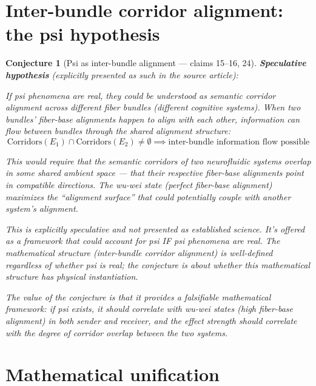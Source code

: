 \documentclass[11pt,a4paper]{article}
\newtheorem{conjecture}[definition]{Conjecture}
\begin{document}
\section{Inter-bundle corridor alignment: the psi hypothesis}
\label{sec:psi}

\begin{conjecture}[Psi as inter-bundle alignment --- claims 15--16, 24]
\label{conj:psi}
\textbf{Speculative hypothesis} (explicitly presented as such in the
source article):

If psi phenomena are real, they could be understood as semantic corridor
alignment across different fiber bundles (different cognitive systems).
When two bundles' fiber-base alignments happen to align with each other,
information can flow between bundles through the shared alignment
structure:
\[
  \text{Corridors}(E_1) \cap \text{Corridors}(E_2) \neq \emptyset
  \implies \text{inter-bundle information flow possible}
\]

This would require that the semantic corridors of two neurofluidic
systems overlap in some shared ambient space --- that their respective
fiber-base alignments point in compatible directions. The wu-wei state
(perfect fiber-base alignment) maximizes the ``alignment surface'' that
could potentially couple with another system's alignment.

This is explicitly speculative and not presented as established science.
It's offered as a framework that \emph{could} account for psi IF psi
phenomena are real. The mathematical structure (inter-bundle corridor
alignment) is well-defined regardless of whether psi is real; the
conjecture is about whether this mathematical structure has physical
instantiation.

The value of the conjecture is that it provides a falsifiable
mathematical framework: if psi exists, it should correlate with
wu-wei states (high fiber-base alignment) in both sender and receiver,
and the effect strength should correlate with the degree of corridor
overlap between the two systems.
\end{conjecture}

\section{Mathematical unification}
\label{sec:unification}
\end{document}
